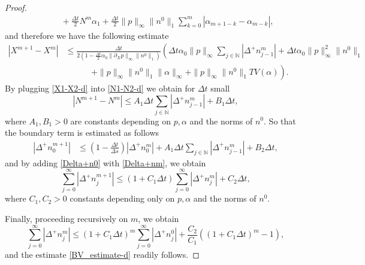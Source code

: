 \documentclass[10pt,a4paper]{amsart}
\newcommand{\N}{\mathbb{N}}
\begin{document}
\begin{proof}
\begin{equation*}
\begin{split}
       &\qquad +\frac{\Delta t}{2} N^m\alpha_1+\frac{\Delta t}{2}\|p\|_\infty\|n^0\|_1\sum_{k=0}^{m}|\alpha_{m+1-k}-\alpha_{m-k}|,
    \end{split}
\end{equation*}
and therefore we have the following estimate
\begin{equation}
\begin{split} \label{X1-X2-d}
     |X^{m+1}-X^m| &\le \frac{\Delta t}{2(1-\frac{\Delta t}{2}\alpha_0\|\partial_X p\|_\infty\|n^0\|_1)}\left(\Delta t\alpha_0\|p\|_\infty\sum_{j\in\N} |\Delta^+ n^m_{j-1}| +\Delta t\alpha_0\|p\|_\infty^2\|n^0\|_1 \right. \\
     &\left.\phantom{\sum_{j\in\N}}+
    \|p\|_\infty\|n^0\|_1\|\alpha\|_\infty+\|p\|_\infty\|n^0\|_1 TV(\alpha)\right).
\end{split}
\end{equation}
By plugging \eqref{X1-X2-d} into \eqref{N1-N2-d} we obtain for $\Delta t$ small
\begin{equation*}
|N^{m+1}-N^m|\le A_1\Delta t\sum_{j\in\N}|\Delta^+ n^m_{j-1}|+B_1\Delta t,
\end{equation*}
where $A_1,B_1>0$ are constants depending on $p,\alpha$ and the norms of $n^0$. So that the boundary term is estimated as follows
\begin{equation}
\label{Delta+n0}
\begin{split}
     |\Delta^{+}n_0^{m+1}|
     &\le \left(1-\frac{\Delta t}{\Delta s}\right)|\Delta^+ n_0^m|+  A_1\Delta t\sum_{j\in\N}|\Delta^+ n^m_{j-1}|+B_2\Delta t,
\end{split}
\end{equation}
and by adding \eqref{Delta+n0} with \eqref{Delta+nm}, we obtain
\begin{equation}
\sum_{j=0}^\infty|\Delta^{+}n_j^{m+1}|\le
(1+C_1\Delta t)\sum_{j=0}^\infty|\Delta^{+}n_j^{m}|+C_2\Delta t,
\end{equation}
where $C_1,C_2>0$ constants depending only on $p,\alpha$ and the norms of $n^0$.

Finally, proceeding recursively on $m$, we obtain
\begin{equation*}
 \sum_{j=0}^\infty|\Delta^{+}n_j^m|\le (1+C_1\Delta t)^{m}\sum_{j=0}^\infty|\Delta^{+}n_j^{0}|+\frac{C_2}{C_1}\left((1+C_1\Delta t)^{m}-1\right),
\end{equation*}
and the estimate \eqref{BV_estimate-d} readily follows.
\end{proof}
\end{document}
